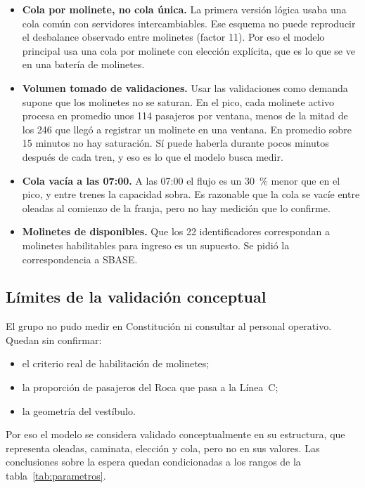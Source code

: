 \begin{itemize}
  \item \textbf{Cola por molinete, no cola única.} La primera versión lógica usaba una cola común con
        servidores intercambiables. Ese esquema no puede reproducir el desbalance observado entre
        molinetes (factor 11). Por eso el modelo principal usa una cola por molinete con elección
        explícita, que es lo que se ve en una batería de molinetes.
  \item \textbf{Volumen tomado de validaciones.} Usar las validaciones como demanda supone que los
        molinetes no se saturan. En el pico, cada molinete activo procesa en promedio unos 114 pasajeros
        por ventana, menos de la mitad de los 246 que llegó a registrar un molinete en una ventana. En
        promedio sobre 15 minutos no hay saturación. Sí puede haberla durante pocos minutos después de
        cada tren, y eso es lo que el modelo busca medir.
  \item \textbf{Cola vacía a las 07:00.} A las 07:00 el flujo es un 30~\% menor que en el pico, y entre
        trenes la capacidad sobra. Es razonable que la cola se vacíe entre oleadas al comienzo de la
        franja, pero no hay medición que lo confirme.
  \item \textbf{Molinetes de \EI{} disponibles.} Que los 22 identificadores correspondan a molinetes
        habilitables para ingreso es un supuesto. Se pidió la correspondencia a SBASE.
\end{itemize}

\subsection{Límites de la validación conceptual}

El grupo no pudo medir en Constitución ni consultar al personal operativo. Quedan sin confirmar:
\begin{itemize}
  \item el criterio real de habilitación de molinetes;
  \item la proporción de pasajeros del Roca que pasa a la Línea~C;
  \item la geometría del vestíbulo.
\end{itemize}
Por eso el modelo se considera validado conceptualmente en su estructura, que representa oleadas,
caminata, elección y cola, pero no en sus valores. Las conclusiones sobre la espera quedan condicionadas a
los rangos de la tabla~\ref{tab:parametros}.
